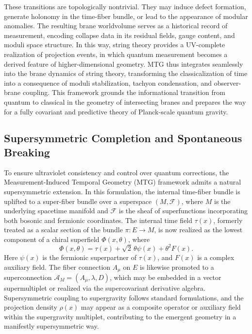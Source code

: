\documentclass[11pt]{article}
\begin{document}
These transitions are topologically nontrivial. They may induce defect formation, generate holonomy in the time-fiber bundle, or lead to the appearance of modular anomalies. The resulting brane worldvolume serves as a historical record of measurement, encoding collapse data in its residual fields, gauge content, and moduli space structure. In this way, string theory provides a UV-complete realization of projection events, in which quantum measurement becomes a derived feature of higher-dimensional geometry. MTG thus integrates seamlessly into the brane dynamics of string theory, transforming the classicalization of time into a consequence of moduli stabilization, tachyon condensation, and observer-brane coupling. This framework grounds the informational transition from quantum to classical in the geometry of intersecting branes and prepares the way for a fully covariant and predictive theory of Planck-scale quantum gravity.

\subsection{Supersymmetric Completion and Spontaneous Breaking}

To ensure ultraviolet consistency and control over quantum corrections, the Measurement-Induced Temporal Geometry (MTG) framework admits a natural supersymmetric extension. In this formulation, the internal time-fiber bundle is uplifted to a super-fiber bundle over a superspace \( (M, \mathcal{F}) \), where \( M \) is the underlying spacetime manifold and \( \mathcal{F} \) is the sheaf of superfunctions incorporating both bosonic and fermionic coordinates. The internal time field \( \tau(x) \), formerly treated as a scalar section of the bundle \( \pi: E \to M \), is now realized as the lowest component of a chiral superfield \( \Phi(x, \theta) \), where
\[
\Phi(x, \theta) = \tau(x) + \sqrt{2} \, \theta \psi(x) + \theta^2 F(x).
\]
Here \( \psi(x) \) is the fermionic superpartner of \( \tau(x) \), and \( F(x) \) is a complex auxiliary field. The fiber connection \( A_\mu \) on \( E \) is likewise promoted to a superconnection \( \mathcal{A}_M = (A_\mu, \lambda, D) \), which may be embedded in a vector supermultiplet or realized via the supercovariant derivative algebra. Supersymmetric coupling to supergravity follows standard formulations, and the projection density \( \rho(x) \) may appear as a composite operator or auxiliary field within the supergravity multiplet, contributing to the emergent geometry in a manifestly supersymmetric way.
\end{document}
